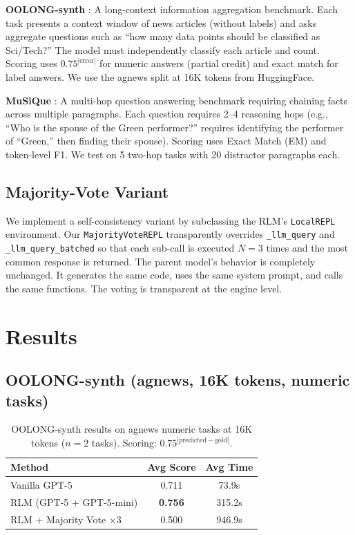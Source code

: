 \documentclass[11pt]{article}
\begin{document}
\textbf{OOLONG-synth} \citep{bertsch2025oolong}: A long-context information aggregation benchmark. Each task presents a context window of news articles (without labels) and asks aggregate questions such as ``how many data points should be classified as Sci/Tech?'' The model must independently classify each article and count. Scoring uses $0.75^{|\text{error}|}$ for numeric answers (partial credit) and exact match for label answers. We use the agnews split at 16K tokens from HuggingFace.

\textbf{MuSiQue} \citep{trivedi2022musique}: A multi-hop question answering benchmark requiring chaining facts across multiple paragraphs. Each question requires 2--4 reasoning hops (e.g., ``Who is the spouse of the Green performer?'' requires identifying the performer of ``Green,'' then finding their spouse). Scoring uses Exact Match (EM) and token-level F1. We test on 5 two-hop tasks with 20 distractor paragraphs each.

\subsection{Majority-Vote Variant}

We implement a self-consistency variant by subclassing the RLM's \texttt{LocalREPL} environment. Our \texttt{MajorityVoteREPL} transparently overrides \texttt{\_llm\_query} and \texttt{\_llm\_query\_batched} so that each sub-call is executed $N=3$ times and the most common response is returned. The parent model's behavior is completely unchanged. It generates the same code, uses the same system prompt, and calls the same functions. The voting is transparent at the engine level.

\section{Results}

\subsection{OOLONG-synth (agnews, 16K tokens, numeric tasks)}

\begin{table}[h]
\centering
\begin{tabular}{lcc}
\toprule
\textbf{Method} & \textbf{Avg Score} & \textbf{Avg Time} \\
\midrule
Vanilla GPT-5 & 0.711 & 73.9s \\
RLM (GPT-5 + GPT-5-mini) & \textbf{0.756} & 315.2s \\
RLM + Majority Vote $\times$3 & 0.500 & 946.9s \\
\bottomrule
\end{tabular}
\caption{OOLONG-synth results on agnews numeric tasks at 16K tokens ($n=2$ tasks). Scoring: $0.75^{|\text{predicted} - \text{gold}|}$.}
\label{tab:oolong}
\end{table}
\end{document}
